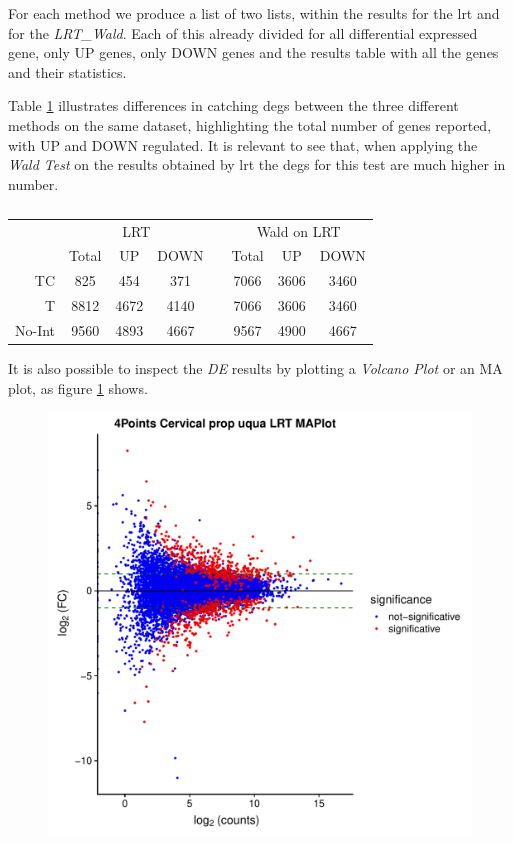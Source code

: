 For each method we produce a list of two lists, within the results for the \gls{lrt} and for the \textit{LRT\_Wald}. Each of this already divided for all differential expressed gene, only UP genes, only DOWN genes and the results table with all the genes and their statistics.

Table \ref{tab:ticorserderesults} illustrates differences in catching \glspl{deg} between the three different methods on the same dataset, highlighting the total number of genes reported, with UP and DOWN regulated. 
It is relevant to see that, when applying the \textit{Wald Test} on the results obtained by \gls{lrt} the \glspl{deg} for this test are much higher in number.

\begin{table}[H]
\centering
\begin{tabular}{r c c c c c c c}
\multicolumn{1}{r}{} & \multicolumn{3}{c}{LRT} && \multicolumn{3}{c}{Wald on LRT} \\
\multicolumn{1}{r}{} & Total & UP & DOWN && Total & UP & DOWN \\
\cline{2-4}\cline{6-8}
TC & 825 & 454 & 371 && 7066 & 3606 & 3460 \\
T & 8812 & 4672 & 4140 && 7066 & 3606 & 3460 \\
No-Int & 9560 & 4893 & 4667 && 9567 & 4900 & 4667 \\
\end{tabular}
\caption[\gls{tic} DE methods results]{}
\label{tab:ticorserderesults}
\end{table}


It is also possible to inspect the \textit{DE} results by plotting a \textit{Volcano Plot} or an MA plot, as figure \ref{fig:ticorservolcma} shows.

\begin{figure}[H]
\includegraphics[width=\textwidth, keepaspectratio]{img/ticorser/de/volcma.pdf}
\caption[ticorser Volcano-MA plots]{}
\label{fig:ticorservolcma}
\centering
\end{figure}

